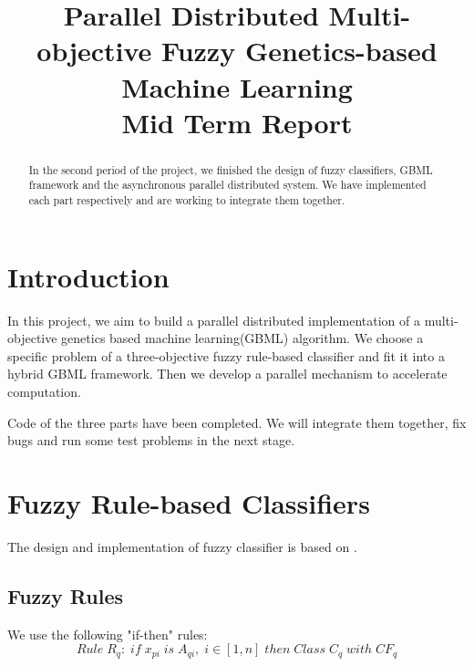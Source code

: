 \documentclass[conference]{IEEEtran}
\begin{document}
  
  \title{Parallel Distributed Multi-objective Fuzzy Genetics-based Machine Learning \\ Mid Term Report}
  
  \author{
  }
  
  \maketitle
  
  \begin{abstract}
  In the second period of the project, we finished the design of fuzzy classifiers, GBML framework and the asynchronous parallel distributed system. We have implemented each part respectively and are working to integrate them together.
  \end{abstract}
  \IEEEpeerreviewmaketitle
  
  \section{Introduction}
  In this project, we aim to build a parallel distributed implementation of a multi-objective genetics based machine learning(GBML) algorithm. We choose a specific problem of a three-objective fuzzy rule-based classifier and fit it into a hybrid GBML framework. Then we develop a parallel mechanism to accelerate computation.

  Code of the three parts have been completed. We will integrate them together, fix bugs and run some test problems in the next stage.

  \section{Fuzzy Rule-based Classifiers}
  The design and implementation of fuzzy classifier is based on \cite{ishibuchi2007analysis}.
  \subsection{Fuzzy Rules}
  We use the following "if-then" rules:
  $$Rule\;R_q:\;if\;x_{pi}\;is\;A_{qi},\;i\in [1,n]\;then\;Class\;C_q\;with\;CF_q$$
\end{document}
